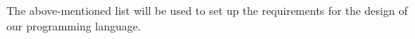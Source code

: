 The above-mentioned list will be used to set up the requirements for the design of our programming language.



